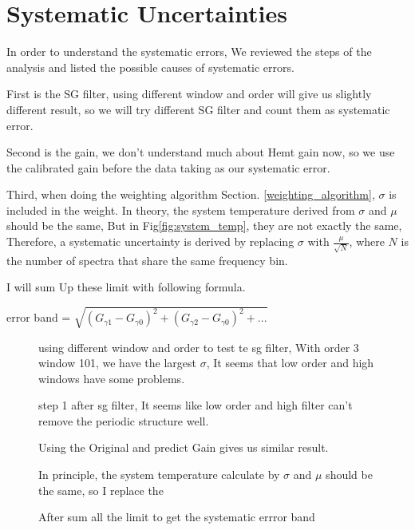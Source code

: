 \section{Systematic Uncertainties}
In order to understand the systematic errors, We reviewed the steps of the analysis and listed the possible causes of systematic errors.

First is the SG filter, using different window and order will give us slightly different result, so we will try different SG filter and count them as systematic error.

Second is the gain, we don’t understand much about Hemt gain now, so we use the calibrated gain before the data taking as our systematic error.

Third, when doing the weighting algorithm Section. \ref{weighting_algorithm}, $\sigma$ is included in the weight. In theory, the system temperature derived from  $\sigma$ and $\mu$ should be the same, But in Fig\ref{fig:system_temp}, they are not exactly the same, Therefore, a systematic uncertainty is derived by replacing $\sigma$ with $\frac{\mu}{\sqrt{N}}$, where $N$ is the number of spectra that share the same frequency bin.  


I will sum Up these limit with following formula.

error band = $\sqrt{(G_{\gamma1}-G_{\gamma0})^2+(G_{\gamma2}-G_{\gamma0})^2+... }$
\begin{figure}[ht!]
    \centering
    \caption{using different window and order to test te sg filter, With order 3 window 101, we have the largest $\sigma$, It seems that low order and high windows have some problems.}
    \label{fig:systematic_sg}
\end{figure}
\begin{figure}[hbt!]
    \centering
    \caption{step 1 after sg filter, It seems like low order and high filter can't remove the periodic structure well.}
    \label{fig:systematic_sg_step_1_3_101}
\end{figure}
\begin{figure}[hbt!]
    \centering
    \caption{Using the Original and predict Gain gives us similar result.}
    \label{fig:systematic_sg_Gain}
\end{figure}
\begin{figure}[hbt!]
    \centering
    \caption{In principle, the system temperature calculate by  $\sigma$ and $\mu$ should be the same, so I replace the }
    \label{fig:systematic_sg_mean}
\end{figure}
\begin{figure}[hbt!]
    \centering
    \caption{After sum all the limit to get the  systematic errror band}
    \label{fig:systematic_sg_mean}
\end{figure}



